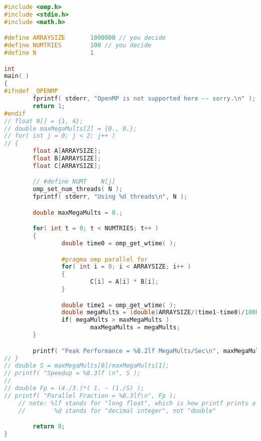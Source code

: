 \documentclass{article}
\begin{document}
\begin{lstlisting}[language=C++, caption={C++ code using listings}]
#include <omp.h>
#include <stdio.h>
#include <math.h>

#define ARRAYSIZE       1000000	// you decide
#define NUMTRIES        100	// you decide
#define N               1

int
main( )
{
#ifndef _OPENMP
        fprintf( stderr, "OpenMP is not supported here -- sorry.\n" );
        return 1;
#endif
// float N[] = {1, 4};
// double maxMegaMults[2] = {0., 0.};
// for( int j = 0; j < 2; j++ )
// {
        float A[ARRAYSIZE];
        float B[ARRAYSIZE];
        float C[ARRAYSIZE];

        // #define NUMT    N[j]
        omp_set_num_threads( N );
        fprintf( stderr, "Using %d threads\n", N );

        double maxMegaMults = 0.;

        for( int t = 0; t < NUMTRIES; t++ )
        {
                double time0 = omp_get_wtime( );

                #pragma omp parallel for
                for( int i = 0; i < ARRAYSIZE; i++ )
                {
                        C[i] = A[i] * B[i];
                }

                double time1 = omp_get_wtime( );
                double megaMults = (double)ARRAYSIZE/(time1-time0)/1000000.;
                if( megaMults > maxMegaMults )
                        maxMegaMults = megaMults;
        }

        printf( "Peak Performance = %8.2lf MegaMults/Sec\n", maxMegaMults );
// }
// double S = maxMegaMults[0]/maxMegaMults[1];
// printf( "Speedup = %8.3lf \n", S );
//
// double Fp = (4./3.)*( 1. - (1./S) );
// printf( "Parallel Fraction = %8.3lf\n", Fp );
	// note: %lf stands for "long float", which is how printf prints a "double"
	//        %d stands for "decimal integer", not "double"

        return 0;
}
\end{lstlisting}
\end{document}
